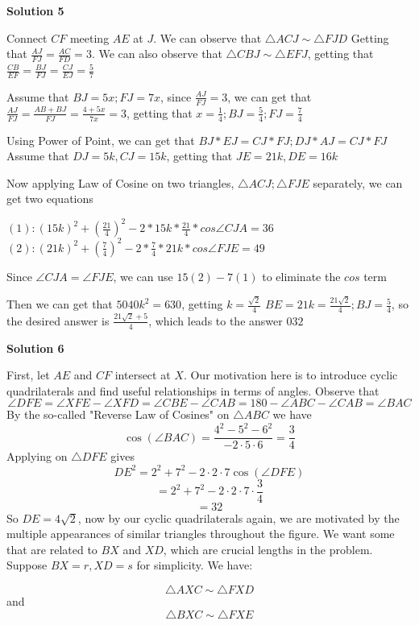 \begin{enumerate}
\textbf{Solution 5}

Connect $CF$ meeting $AE$ at $J$. We can observe that $\triangle{ACJ}\sim \triangle{FJD}$ Getting that $\frac{AJ}{FJ}=\frac{AC}{FD}=3$. We can also observe that $\triangle{CBJ}\sim \triangle{EFJ}$, getting that $\frac{CB}{EF}=\frac{BJ}{FJ}=\frac{CJ}{EJ}=\frac{5}{7}$

 Assume that $BJ=5x;FJ=7x$, since $\frac{AJ}{FJ}=3$, we can get that $\frac{AJ}{FJ}=\frac{AB+BJ}{FJ}=\frac{4+5x}{7x}=3$, getting that $x=\frac{1}{4}; BJ=\frac{5}{4}; FJ=\frac{7}{4}$

 Using Power of Point, we can get that $BJ * EJ=CJ*FJ; DJ * AJ=CJ * FJ$ Assume that $DJ=5k,CJ=15k$, getting that $JE=21k, DE=16k$

 Now applying Law of Cosine on two triangles, $\triangle{ACJ};\triangle{FJE}$ separately, we can get two equations

 $(1): (15k)^2+(\frac{21}{4})^2-2*15k *\frac{21}{4} * cos\angle{CJA}=36$
$(2):(21k)^2+(\frac{7}{4})^2-2*\frac{7}{4} * 21k*cos\angle{FJE}=49$

 Since $\angle{CJA}=\angle{FJE}$, we can use $15(2)-7(1)$ to eliminate the $cos$ term

 Then we can get that $5040k^2=630$, getting $k=\frac{\sqrt{2}}{4}$
$BE=21k=\frac{21\sqrt{2}}{4}; BJ=\frac{5}{4}$, so the desired answer is $\frac{21\sqrt{2}+5}{4}$, which leads to the answer $\boxed{032}$




\textbf{Solution 6}

First, let $AE$ and $CF$ intersect at $X$. Our motivation here is to introduce cyclic quadrilaterals and find useful relationships in terms of angles. Observe that
 \[\angle DFE = \angle XFE - \angle XFD = \angle CBE - \angle CAB = 180 - \angle ABC - \angle CAB = \angle BAC\]By the so-called "Reverse Law of Cosines" on $\triangle ABC$ we have
 \[\cos(\angle BAC) = \frac{4^2 - 5^2 - 6^2}{-2 \cdot 5 \cdot 6} = \frac{3}{4}\]Applying on $\triangle DFE$ gives
 \[DE^2 = 2^2 + 7^2 - 2 \cdot 2 \cdot 7 \cos(\angle DFE)\]
 \[= 2^2 + 7^2 - 2 \cdot 2 \cdot 7 \cdot \frac{3}{4}\]
 \[=32\]So $DE = 4 \sqrt{2}$, now by our cyclic quadrilaterals again, we are motivated by the multiple appearances of similar triangles throughout the figure. We want some that are related to $BX$ and $XD$, which are crucial lengths in the problem. Suppose $BX = r, XD = s$ for simplicity. We have:

 
 \[\triangle AXC \sim \triangle FXD\]and
 \[\triangle BXC \sim \triangle FXE\]


\end{enumerate}

